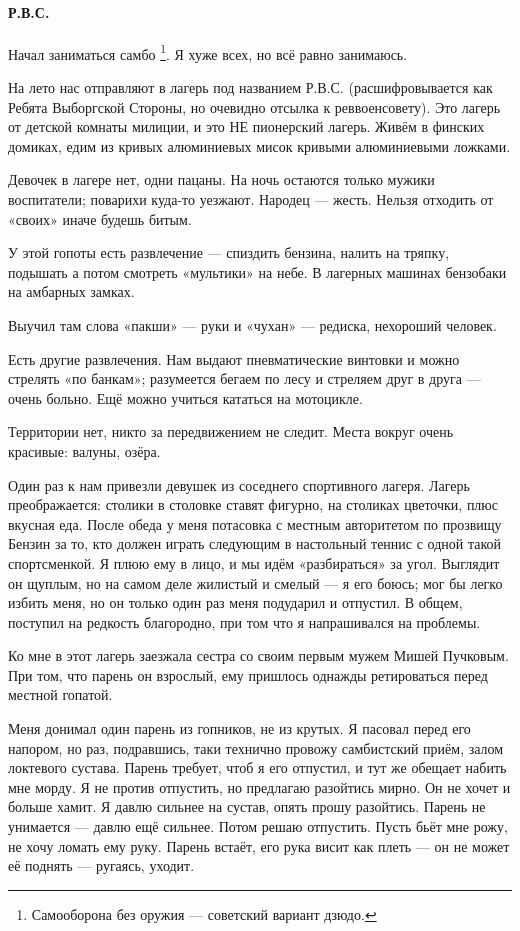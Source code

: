 \documentclass{book}
\begin{document}
\paragraph{Р.В.С.}
Начал заниматься самбо%
\footnote{Самооборона без оружия --- советский вариант дзюдо.}.
Я хуже всех, но всё равно занимаюсь.

На лето нас отправляют в лагерь под названием Р.В.С. (расшифровывается как Ребята Выборгской Стороны, но очевидно отсылка к реввоенсовету).
Это лагерь от детской комнаты милиции,
и это НЕ пионерский лагерь.
Живём в финских домиках, 
едим из кривых алюминиевых мисок кривыми алюминиевыми ложками.

Девочек в лагере нет, одни пацаны.
На ночь остаются только мужики воспитатели;
поварихи куда-то уезжают.
Народец --- жесть.
Нельзя отходить от «своих» иначе будешь битым.

У этой гопоты есть развлечение --- спиздить бензина, налить на тряпку, подышать а потом смотреть «мультики» на небе.
В лагерных машинах бензобаки на амбарных замках.

Выучил там слова «пакши» --- руки и «чухан» --- редиска, нехороший человек.

Есть другие развлечения.
Нам выдают пневматические винтовки и можно стрелять «по банкам»;
разумеется бегаем по лесу и стреляем друг в друга --- очень больно.
Ещё можно учиться кататься на мотоцикле.

Территории нет, никто за передвижением не следит.
Места вокруг очень красивые: валуны, озёра.

Один раз к нам привезли девушек из соседнего спортивного лагеря.
Лагерь преображается: столики в столовке ставят фигурно, на столиках цветочки, плюс вкусная еда.
После обеда у меня потасовка с местным авторитетом по прозвищу Бензин за то, кто должен играть следующим в настольный теннис с одной такой спортсменкой.
Я плюю ему в лицо, и мы идём «разбираться» за угол.
Выглядит он щуплым, но на самом деле жилистый и смелый --- я его боюсь;
мог бы легко избить меня, но он только один раз меня подударил и отпустил.
В общем, поступил на редкость благородно, при том что я напрашивался на проблемы.

Ко мне в этот лагерь заезжала сестра со своим первым мужем Мишей Пучковым.
При том, что парень он взрослый, ему пришлось однажды ретироваться перед местной гопатой.

Меня донимал один парень из гопников, не из крутых.
Я пасовал перед его напором, но раз, подравшись, таки технично провожу самбистский приём, залом локтевого сустава. 
Парень требует, чтоб я его отпустил, и тут же обещает набить мне морду.
Я не против отпустить, но предлагаю разойтись мирно.
Он не хочет и больше хамит.
Я давлю сильнее на сустав, опять прошу разойтись.
Парень не унимается --- давлю ещё сильнее.
Потом решаю отпустить.
Пусть бьёт мне рожу, не хочу ломать ему руку.
Парень встаёт, его рука висит как плеть --- он не может её поднять --- ругаясь, уходит.
\end{document}
